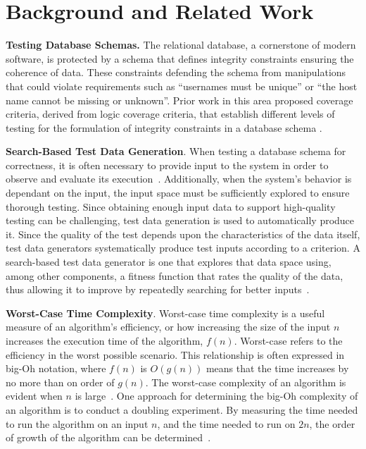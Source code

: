 
\section{Background and Related Work}




{\bf Testing Database Schemas.} The relational database, a cornerstone of modern software, is protected by a schema that
defines integrity constraints ensuring the coherence of data. These constraints defending the schema from manipulations
that could violate requirements such as ``usernames must be unique'' or ``the host name cannot be missing or unknown''.
Prior work in this area proposed coverage criteria, derived from logic coverage criteria, that establish different
levels of testing for the formulation of integrity constraints in a database schema \cite{mcminn2015}.

{\bf Search-Based Test Data Generation}. When testing a database schema for correctness, it is often necessary to
provide input to the system in order to observe and evaluate its execution~\cite{ammann2008}. Additionally, when the
system's behavior is dependant on the input, the input space must be sufficiently explored to ensure thorough testing.
Since obtaining enough input data to support high-quality testing can be challenging, test data generation is used to
automatically produce it. Since the quality of the test depends upon the characteristics of the data itself, test data
generators systematically produce test inputs according to a criterion. A search-based test data generator is one that
explores that data space using, among other components, a fitness function that rates the quality of the data, thus
allowing it to improve by repeatedly searching for better inputs~\cite{mcminn2004a}.

{\bf Worst-Case Time Complexity}. Worst-case time complexity is a useful measure of an algorithm's efficiency, or how
increasing the size of the input $n$ increases the execution time of the algorithm, $f(n)$.  Worst-case refers to the
efficiency in the worst possible scenario.  This relationship is often expressed in big-Oh notation, where $f(n)$ is
$O(g(n))$ means that the time increases by no more than on order of $g(n)$. The worst-case complexity of an algorithm is
evident when $n$ is large~\cite{Goodrich2014}. One approach for determining the big-Oh complexity of an algorithm is to
conduct a doubling experiment. By measuring the time needed to run the algorithm on an input $n$, and the time needed to
run on $2n$, the order of growth of the algorithm can be determined~\cite{McGeoch2012,Sedgewick1998}.

